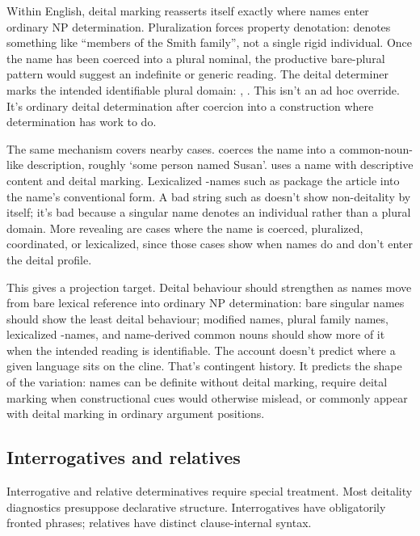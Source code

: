 \documentclass[12pt,letterpaper]{article}
\begin{document}
Within English, deital marking reasserts itself exactly where names enter ordinary NP determination. Pluralization forces property denotation:  denotes something like \enquote{members of the Smith family}, not a single rigid individual. Once the name has been coerced into a plural nominal, the productive bare-plural pattern would suggest an indefinite or generic reading. The deital determiner marks the intended identifiable plural domain: , . This isn't an ad hoc override. It's ordinary deital determination after coercion into a construction where determination has work to do.

The same mechanism covers nearby cases.  coerces the name into a common-noun-like description, roughly `some person named Susan'.  uses a name with descriptive content and deital marking. Lexicalized -names such as  package the article into the name's conventional form. A bad string such as  doesn't show non-deitality by itself; it's bad because a singular name denotes an individual rather than a plural domain. More revealing are cases where the name is coerced, pluralized, coordinated, or lexicalized, since those cases show when names do and don't enter the deital profile.

This gives a projection target. Deital behaviour should strengthen as names move from bare lexical reference into ordinary NP determination: bare singular names should show the least deital behaviour; modified names, plural family names, lexicalized -names, and name-derived common nouns should show more of it when the intended reading is identifiable. The account doesn't predict where a given language sits on the cline. That's contingent history. It predicts the shape of the variation: names can be definite without deital marking, require deital marking when constructional cues would otherwise mislead, or commonly appear with deital marking in ordinary argument positions.

\subsection{Interrogatives and relatives}

Interrogative and relative determinatives require special treatment. Most deitality diagnostics presuppose declarative structure. Interrogatives have obligatorily fronted phrases; relatives have distinct clause-internal syntax.
\end{document}

